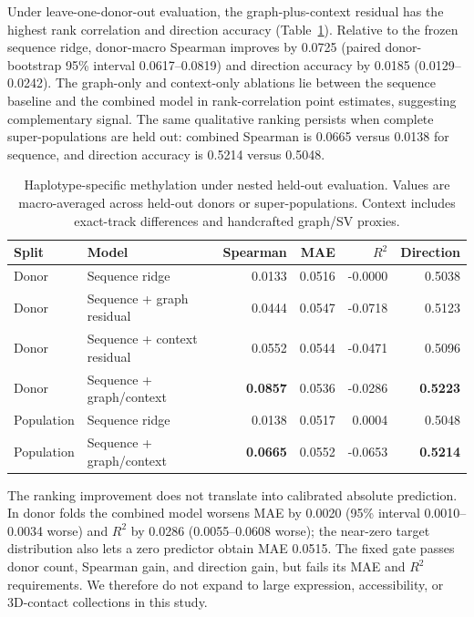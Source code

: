 \IfFileExists{ws-procs11x85.cls}{\worldscientificclasstrue\documentclass{ws-procs11x85}}{\worldscientificclassfalse\documentclass[11pt]{article}\usepackage[margin=1in]{geometry}}
\providecommand{\tbl}[2]{\caption{#1}#2}
\providecommand{\toprule}{\hline}
\providecommand{\colrule}{\hline}
\providecommand{\botrule}{\hline}
\begin{document}
Under leave-one-donor-out evaluation, the graph-plus-context residual has the
highest rank correlation and direction accuracy (Table~\ref{tab:haplotype}).
Relative to the frozen sequence ridge, donor-macro Spearman improves by 0.0725
(paired donor-bootstrap 95\% interval 0.0617--0.0819) and direction accuracy by
0.0185 (0.0129--0.0242). The graph-only and context-only ablations lie between
the sequence baseline and the combined model in rank-correlation point
estimates, suggesting complementary signal. The same qualitative ranking
persists when complete super-populations are held out: combined Spearman is
0.0665 versus 0.0138 for sequence, and direction accuracy is 0.5214 versus
0.5048.

\begin{table}[h!]
\tbl{Haplotype-specific methylation under nested held-out evaluation. Values
are macro-averaged across held-out donors or super-populations. Context includes
exact-track differences and handcrafted graph/SV proxies.}
{\small
\begin{tabular}{@{}llrrrr@{}}
\toprule
Split & Model & Spearman & MAE & $R^2$ & Direction\\
\colrule
Donor & Sequence ridge & 0.0133 & 0.0516 & -0.0000 & 0.5038\\
Donor & Sequence + graph residual & 0.0444 & 0.0547 & -0.0718 & 0.5123\\
Donor & Sequence + context residual & 0.0552 & 0.0544 & -0.0471 & 0.5096\\
Donor & Sequence + graph/context & \textbf{0.0857} & 0.0536 & -0.0286 & \textbf{0.5223}\\
\colrule
Population & Sequence ridge & 0.0138 & 0.0517 & 0.0004 & 0.5048\\
Population & Sequence + graph/context & \textbf{0.0665} & 0.0552 & -0.0653 & \textbf{0.5214}\\
\botrule
\end{tabular}}
\label{tab:haplotype}
\end{table}

The ranking improvement does not translate into calibrated absolute
prediction. In donor folds the combined model worsens MAE by 0.0020 (95\%
interval 0.0010--0.0034 worse) and $R^2$ by 0.0286 (0.0055--0.0608 worse);
the near-zero target distribution also lets a zero predictor obtain MAE 0.0515.
The fixed gate passes donor count, Spearman gain, and direction gain, but fails
its MAE and $R^2$ requirements. We therefore do not expand to large expression,
accessibility, or 3D-contact collections in this study.
\end{document}
